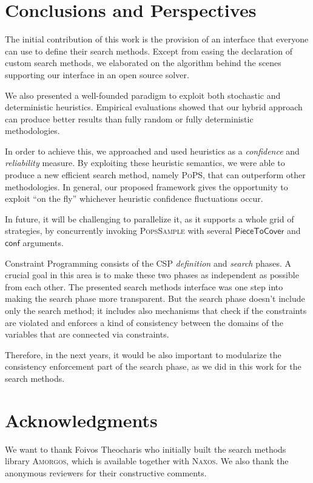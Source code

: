 \documentclass{ws-ijait}
\begin{document}
\section{Conclusions and Perspectives}

The initial contribution of this work is the provision of an
interface that everyone can use to define their search
methods. Except from easing the declaration of custom search
methods, we elaborated on the algorithm behind the scenes
supporting our interface in an open source solver.

We also presented a well-founded paradigm to exploit both
stochastic and deterministic heuristics. Empirical
evaluations showed that our hybrid approach can produce
better results than fully random or fully deterministic
methodologies.

In order to achieve this, we approached and used heuristics
as a \emph{confidence} and \emph{reliability} measure. By
exploiting these heuristic semantics, we were able to
produce a new efficient search method, namely \textsc{PoPS},
that can outperform other methodologies. In general, our
proposed framework gives the opportunity to exploit ``on the
fly'' whichever heuristic confidence fluctuations occur.

In future, it will be challenging to parallelize it, as it
supports a whole grid of strategies, by concurrently
invoking \textsc{PopsSample} with several
$\mathsf{PieceToCover}$ and $\mathsf{conf}$ arguments.

Constraint Programming consists of the CSP \emph{definition}
and \emph{search} phases. A crucial goal in this area is to
make these two phases as independent as possible from each
other.\cite{Freuder2014} The presented search methods
interface was one step into making the search phase more
transparent. But the search phase doesn't include only the
search method; it includes also mechanisms that check if the
constraints are violated and enforces a kind of consistency
between the domains of the variables that are connected via
constraints.\cite{Chen2013}

Therefore, in the next years, it would be also important to
modularize the consistency enforcement part of the search
phase, as we did in this work for the search methods.


\section*{Acknowledgments}

We want to thank Foivos Theocharis who initially built the
search methods library \textsc{Amorgos}, which is available
together with \textsc{Naxos}.\cite{Naxos} We also thank the
anonymous reviewers for their constructive comments.
\end{document}
